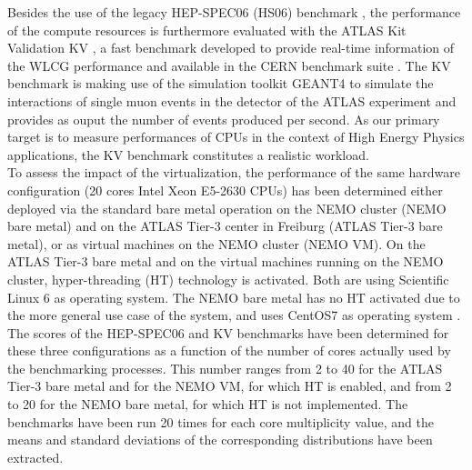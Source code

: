 Besides the use of the legacy HEP-SPEC06 (HS06) benchmark \cite{Hepspec}, the performance of the compute resources is furthermore evaluated with the ATLAS Kit Validation
KV \cite{DeSalvo:2010zza}, a fast benchmark developed to provide real-time information of the WLCG performance and available in the CERN benchmark suite \cite{Alef:2017jyx}.
The KV benchmark is making use of the simulation toolkit GEANT4 \cite{Agostinelli:2002hh} to simulate the interactions of single muon events in the detector of the ATLAS experiment
and provides as ouput the number of events produced per second. As our primary target is to measure performances of CPUs in the context of High Energy Physics applications, the KV benchmark
constitutes a realistic workload. \\

To assess the impact of the virtualization, the performance of the same hardware configuration (20 cores Intel Xeon E5-2630 CPUs) has been determined either deployed via
the standard bare metal operation on the NEMO cluster (NEMO bare metal) and on the ATLAS Tier-3 center in Freiburg (ATLAS Tier-3 bare metal), or as virtual machines on the
NEMO cluster (NEMO VM). On the ATLAS Tier-3 bare metal and on the virtual machines running on the NEMO cluster, hyper-threading (HT) technology is activated. Both are using Scientific
Linux 6 \cite{SL6} as operating system. The NEMO bare metal has no HT activated due to the more general use case of the system, and uses CentOS7 as operating system \cite{CentOS7}. 
The scores of the HEP-SPEC06 and KV benchmarks have been determined for these three configurations as a function of the number of cores actually used by the benchmarking processes.
This number ranges from 2 to 40 for the ATLAS Tier-3 bare metal and for the NEMO VM, for which HT is enabled, and from 2 to 20 for the NEMO bare metal, for which HT is not implemented.
The benchmarks have been run 20 times for each core multiplicity value, and the means and standard deviations of the corresponding distributions have been extracted. \\


